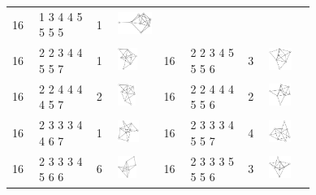 \begin{footnotesize}
\begin{longtable}{
        m{0.05\linewidth} m{0.15\linewidth} m{0.05\linewidth} m{0.12\linewidth} |
        m{0.05\linewidth} m{0.15\linewidth} m{0.05\linewidth} m{0.12\linewidth}
    }
16 & 1 3 4 4 5 5 5 5 & 1 & \includegraphics[height=0.7151cm]{15-universal-graphs/img/degree-sequences-example-graphs/graph-4-8-133}\\
16 & 2 2 3 4 4 5 5 7 & 1 & \includegraphics[height=0.7151cm]{15-universal-graphs/img/degree-sequences-example-graphs/graph-4-8-134} &
16 & 2 2 3 4 5 5 5 6 & 3 & \includegraphics[height=0.7151cm]{15-universal-graphs/img/degree-sequences-example-graphs/graph-4-8-135}\\
16 & 2 2 4 4 4 4 5 7 & 2 & \includegraphics[height=0.7151cm]{15-universal-graphs/img/degree-sequences-example-graphs/graph-4-8-136} &
16 & 2 2 4 4 4 5 5 6 & 2 & \includegraphics[height=0.7151cm]{15-universal-graphs/img/degree-sequences-example-graphs/graph-4-8-137}\\
16 & 2 3 3 3 4 4 6 7 & 1 & \includegraphics[height=0.7151cm]{15-universal-graphs/img/degree-sequences-example-graphs/graph-4-8-138} &
16 & 2 3 3 3 4 5 5 7 & 4 & \includegraphics[height=0.7151cm]{15-universal-graphs/img/degree-sequences-example-graphs/graph-4-8-139}\\
16 & 2 3 3 3 4 5 6 6 & 6 & \includegraphics[height=0.7151cm]{15-universal-graphs/img/degree-sequences-example-graphs/graph-4-8-140} &
16 & 2 3 3 3 5 5 5 6 & 3 & \includegraphics[height=0.7151cm]{15-universal-graphs/img/degree-sequences-example-graphs/graph-4-8-141}\\

\end{longtable}
\end{footnotesize}
